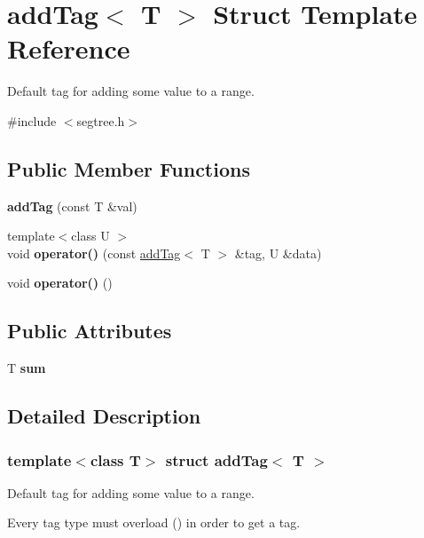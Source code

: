 \hypertarget{structadd_tag}{}\section{add\+Tag$<$ T $>$ Struct Template Reference}
\label{structadd_tag}


Default tag for adding some value to a range.  




{\ttfamily \#include $<$segtree.\+h$>$}

\subsection*{Public Member Functions}
\begin{DoxyCompactItemize}
\item 
\mbox{\label{structadd_tag_a40e6ca6f6f5c493f0cd46228453292d0}} 
{\bfseries add\+Tag} (const T \&val)
\item 
\mbox{\label{structadd_tag_a869daa1c95ce5d8562eb93f99f94d991}} 
{\footnotesize template$<$class U $>$ }\\void {\bfseries operator()} (const \mbox{\hyperlink{structadd_tag}{add\+Tag}}$<$ T $>$ \&tag, U \&data)
\item 
\mbox{\label{structadd_tag_a54d061063e2980e7bc58d847c4efe679}} 
void {\bfseries operator()} ()
\end{DoxyCompactItemize}
\subsection*{Public Attributes}
\begin{DoxyCompactItemize}
\item 
\mbox{\label{structadd_tag_a09c0168bbb97ce16d5e2c4ab648026a1}} 
T {\bfseries sum}
\end{DoxyCompactItemize}


\subsection{Detailed Description}
\subsubsection*{template$<$class T$>$\newline
struct add\+Tag$<$ T $>$}

Default tag for adding some value to a range. 

Every tag type must overload () in order to get a tag. 